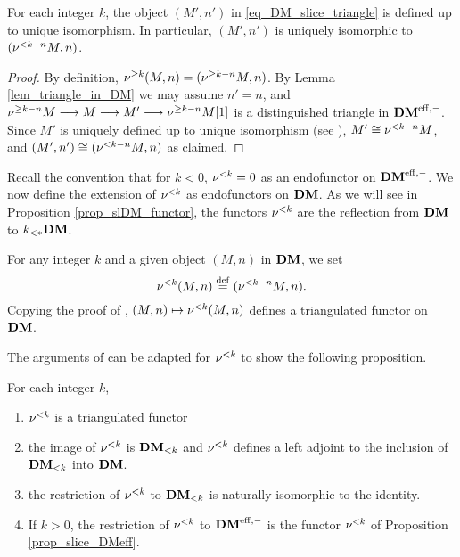 \begin{lem}
For each integer $k$, the object $(M', n')$ in 
\eqref{eq_DM_slice_triangle} is defined up to unique isomorphism.
In particular, $(M', n')$ is uniquely isomorphic to 
$(\slDM{k - n} M, n)$.
\end{lem}
\begin{proof}
By definition, $\sgDM{k}(M, n) = (\sgDM{k - n}M, n)$. By Lemma
\ref{lem_triangle_in_DM} we may assume $n' = n$, and $\sgDM{k -
 n} M \to M \to M' \to \sgDM{k - n}M[1]$ is a distinguished
triangle in $\DMeff$. Since $M'$ is uniquely defined up to unique
isomorphism (see \cite[1.3(i)]{HuKa}), $M' \cong \slDM{k - n} M$,
and $(M', n') \cong (\slDM{k - n}M, n)$ as claimed.
\end{proof}

Recall the convention that for $k < 0$, $\slDM{k} = 0$ as an
endofunctor on $\DMeff$. We now define the extension of $\slDM{k}$
as endofunctors on $\DM$. As we will see in Proposition
\ref{prop_slDM_functor}, the functors $\slDM{k}$ are the reflection
from $\DM$ to $\LFiltDM{k}{\DM}$.

\begin{defn}\label{def_slDM_DM}
For any integer $k$ and a given object $(M, n)$ in $\DM$, we 
set
\[
\slDM{k}(M, n) \defeq (\slDM{k - n}M, n).
\]
Copying the proof of \cite[1.3]{HuKa}, $(M, n) \mapsto 
\slDM{k}(M, n)$ defines a triangulated functor on $\DM$.
\end{defn}

The arguments of \cite[1.3]{HuKa} can be adapted for $\slDM{k}$
to show the following proposition.

\begin{prop}\label{prop_slDM_functor}
For each integer $k$,
\begin{enumerate}
\item $\slDM{k}$ is a triangulated functor

\item the image of $\slDM{k}$ is $\LFiltDM[k]{\DM}$ and $\slDM{k}$ 
defines a left adjoint to the inclusion of $\LFiltDM[k]{\DM}$ into 
$\DM$.

\item the restriction of $\slDM{k}$ to $\LFiltDM[k]{\DM}$ is naturally
isomorphic to the identity.

\item If $k > 0$, the restriction of $\slDM{k}$ to $\DMeff$ is the
functor $\slDM{k}$ of Proposition \ref{prop_slice_DMeff}.
\end{enumerate}
\end{prop}

